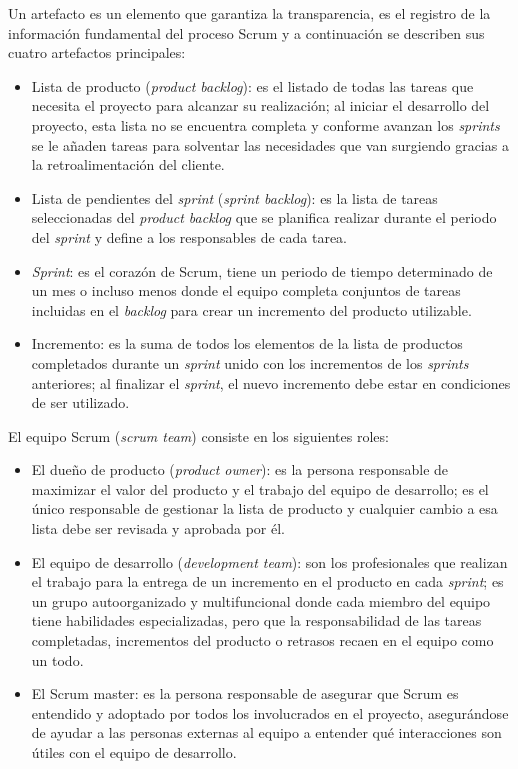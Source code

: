 Un artefacto es un elemento que garantiza la transparencia, es el registro de la información fundamental del proceso Scrum y a continuación se describen sus cuatro artefactos principales:

\begin{itemize}
	\item Lista de producto (\textit{product backlog}):	es el listado de todas las tareas que necesita el proyecto para alcanzar su realización; al iniciar el desarrollo del proyecto, esta lista no se encuentra completa y conforme avanzan los \textit{sprints} se le añaden tareas para solventar las necesidades que van surgiendo gracias a la retroalimentación del cliente.
	\item Lista de pendientes del \textit{sprint} (\textit{sprint backlog}): es la lista de tareas seleccionadas del \textit{product backlog} que se planifica realizar durante el periodo del \textit{sprint} y define a los responsables de cada tarea.
	\item \textit{Sprint}: es el corazón de Scrum, tiene un periodo de tiempo determinado de un mes o incluso menos donde el equipo completa conjuntos de tareas incluidas en el \textit{backlog} para crear un incremento del producto utilizable.
	\item Incremento: es la suma de todos los elementos de la lista de productos completados durante un \textit{sprint} unido con los incrementos de los \textit{sprints} anteriores; al finalizar el \textit{sprint}, el nuevo incremento debe estar en condiciones de ser utilizado.
\end{itemize}

El equipo Scrum (\textit{scrum team}) consiste en los siguientes roles:
\begin{itemize}
	\item El dueño de producto (\textit{product owner}): es la persona responsable de maximizar el valor del producto y el trabajo del equipo de desarrollo; es el único responsable de gestionar la lista de producto y cualquier cambio a esa lista debe ser revisada y aprobada por él.
	\item El equipo de desarrollo (\textit{development team}): son los profesionales que realizan el trabajo para la entrega de un incremento en el producto en cada \textit{sprint}; es un grupo autoorganizado y multifuncional donde cada miembro del equipo tiene habilidades especializadas, pero que la responsabilidad de las tareas completadas, incrementos del producto o retrasos recaen en el equipo como un todo.
	\item  El Scrum master: es la persona responsable de asegurar que Scrum es entendido y adoptado por todos los involucrados en el proyecto, asegurándose de ayudar a las personas externas al equipo a entender qué interacciones son útiles con el equipo de desarrollo.
\end{itemize}


